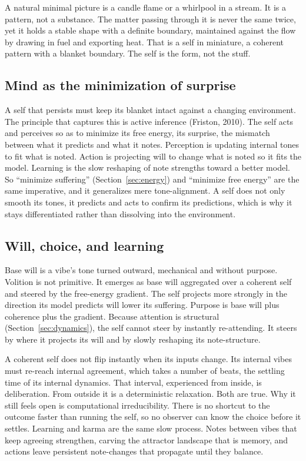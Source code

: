A natural minimal picture is a candle flame or a whirlpool in a stream. It is a pattern, not a substance. The matter passing through it is never the same twice, yet it holds a stable shape with a definite boundary, maintained against the flow by drawing in fuel and exporting heat. That is a self in miniature, a coherent pattern with a blanket boundary. The self is the form, not the stuff.

\subsection{Mind as the minimization of surprise}

A self that persists must keep its blanket intact against a changing environment. The principle that captures this is active inference (Friston, 2010). The self acts and perceives so as to minimize its free energy, its surprise, the mismatch between what it predicts and what it notes. Perception is updating internal tones to fit what is noted. Action is projecting will to change what is noted so it fits the model. Learning is the slow reshaping of note strengths toward a better model. So ``minimize suffering'' (Section~\ref{sec:energy}) and ``minimize free energy'' are the same imperative, and it generalizes mere tone-alignment. A self does not only smooth its tones, it predicts and acts to confirm its predictions, which is why it stays differentiated rather than dissolving into the environment.

\subsection{Will, choice, and learning}

Base will is a vibe's tone turned outward, mechanical and without purpose. Volition is not primitive. It emerges as base will aggregated over a coherent self and steered by the free-energy gradient. The self projects more strongly in the direction its model predicts will lower its suffering. Purpose is base will plus coherence plus the gradient. Because attention is structural (Section~\ref{sec:dynamics}), the self cannot steer by instantly re-attending. It steers by where it projects its will and by slowly reshaping its note-structure.

A coherent self does not flip instantly when its inputs change. Its internal vibes must re-reach internal agreement, which takes a number of beats, the settling time of its internal dynamics. That interval, experienced from inside, is deliberation. From outside it is a deterministic relaxation. Both are true. Why it still feels open is computational irreducibility. There is no shortcut to the outcome faster than running the self, so no observer can know the choice before it settles. Learning and karma are the same slow process. Notes between vibes that keep agreeing strengthen, carving the attractor landscape that is memory, and actions leave persistent note-changes that propagate until they balance.
